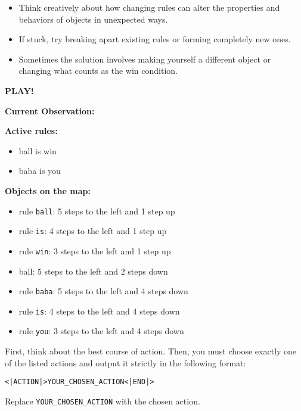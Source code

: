 \begin{GreenBox}
\begin{itemize}
		\item Think creatively about how changing rules can alter the properties and
			behaviors of objects in unexpected ways.

		\item If stuck, try breaking apart existing rules or forming completely new
			ones.

		\item Sometimes the solution involves making yourself a different object or changing
			what counts as the win condition.
	\end{itemize}

	\textbf{PLAY!}

	\textbf{Current Observation:}

	\textbf{Active rules:}
	\begin{itemize}
		\item ball is win

		\item baba is you
	\end{itemize}

	\textbf{Objects on the map:}
	\begin{itemize}
		\item rule \texttt{ball}: 5 steps to the left and 1 step up

		\item rule \texttt{is}: 4 steps to the left and 1 step up

		\item rule \texttt{win}: 3 steps to the left and 1 step up

		\item ball: 5 steps to the left and 2 steps down

		\item rule \texttt{baba}: 5 steps to the left and 4 steps down

		\item rule \texttt{is}: 4 steps to the left and 4 steps down

		\item rule \texttt{you}: 3 steps to the left and 4 steps down
	\end{itemize}

	First, think about the best course of action. Then, you must choose exactly
	one of the listed actions and output it strictly in the following format:

	\texttt{<|ACTION|>YOUR\_CHOSEN\_ACTION<|END|>}

	Replace \texttt{YOUR\_CHOSEN\_ACTION} with the chosen action.
\end{GreenBox}

